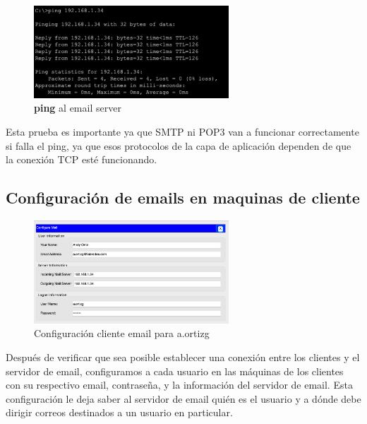 \documentclass[10pt]{article}
\begin{document}
\begin{figure}[H]
    \centering
    \includegraphics[width=0.65\textwidth]{lab-01-screenshots/45-2-ping-email}
    \caption{\textbf{ping} al email server}
\end{figure}

Esta prueba es importante ya que SMTP ni POP3 van a funcionar correctamente si falla el ping, ya que esos protocolos de la capa de aplicación dependen de que la conexión TCP esté funcionando.

\subsection{Configuración de emails en maquinas de cliente}

\begin{figure}[H]
    \centering
    \includegraphics[width=0.65\textwidth]{lab-01-screenshots/45-3-client-config.png}
    \caption{Configuración cliente email para a.ortizg}
\end{figure}

Después de verificar que sea posible establecer una conexión entre los clientes y el servidor de email, configuramos a cada usuario en las máquinas de los clientes con su respectivo email, contraseña, y la información del servidor de email. Esta configuración le deja saber al servidor de email quién es el usuario y a dónde debe dirigir correos destinados a un usuario en particular.
\end{document}
